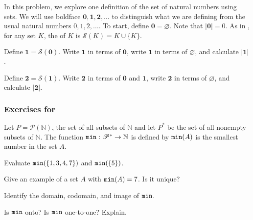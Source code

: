 \begin{exer}[\exerE] %
\label{exer_constructing_naturals}
    In this problem, we explore one definition of the set of natural numbers using sets. We will use boldface $\mathbf{0}, \mathbf{1}, \mathbf{2}, \ldots$ to distinguish what we are defining from the usual natural numbers $0, 1, 2, \ldots$. To start, define $\mathbf{0} = \varnothing$. Note that $|\mathbf{0}|=0$.  As in , for any set $K$, the  of $K$ is $\mathscr{S}(K)= K \cup \{K\}$.
    \begin{exerpart}
        \item Define $\mathbf{1} = \mathscr{S}(\mathbf{0})$.  Write $\mathbf{1}$ in terms of $\mathbf{0}$, write $\mathbf{1}$ in terms of $\varnothing$, and calculate $|\mathbf{1}|$.
        
        \item Define $\mathbf{2} =  \mathscr{S}(\mathbf{1})$.  Write $\mathbf{2}$ in terms of $\mathbf{0}$ and $\mathbf{1}$, write $\mathbf{2}$ in terms of $\varnothing$, and calculate $|\mathbf{2}|$.      
    \end{exerpart}
\end{exer}


\subsubsection*{Exercises for 
\subsetfn}

\begin{exer}[\exerP] %
\label{exer_min_function_on_sets}
    Let $P = \mathscr{P}(\mathbb{N})$, the set of all subsets of $\mathbb{N}$ and let $P^*$ be the set of all nonempty subsets of $\mathbb{N}$.  The function $\texttt{min}:\mathscr{P}^* \to \mathbb{N}$ is defined by $\texttt{min}(A)$ is the smallest number in the set $A$.  
        \begin{exerpart}
            \item Evaluate $\texttt{min}(\{1,3,4,7\})$ and $\texttt{min}(\{5\})$.
            \item Give an example of a set $A$ with $\texttt{min}(A) = 7$.  Is it unique?
            \item Identify the domain, codomain, and image of $\texttt{min}$.
            \item Is $\texttt{min}$ onto?  Is $\texttt{min}$ one-to-one?  Explain.
        \end{exerpart}  
\end{exer}

